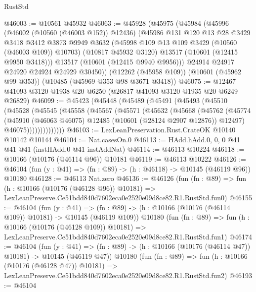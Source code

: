 \begin{lexlean}{RustStd}
\begin{coremodule}
@46003 := @10561 @45932
@46063 := @45928
    (@45975
      (@45984
        (@45996
          (@46002 (@10560 (@46003 @152)) @12436)
          (@45986
            @131
            @120
            @13
            @28
            @3429
            @3418
            @3412
            @3873
            @9949
            @3632
            (@45998 @109 @13 @109 @3429 (@10560 (@46003 @109)) @10703)
            (@10817 @45932 @3120)
            @13517
            (@10601 (@12415 @9950 @3418)))
          @13517
          (@10601 (@12415 @9940 @9956)))
        @24914
        @24917
        @24920
        @24924
        @24929
        @30450))
    (@12262 (@45958 @109))
    (@10601 (@45962 @99 @353))
    (@10485 (@45969 @353 @98 @3671 @3418))
@46075 := @12467 @41093 @3120 @1938 @20 @6250 (@26817 @41093 @3120 @1935 @20 @6249 @26829)
@46099 := @45423
    (@45448
      (@45489
        (@45491
          (@45493
            (@45510
              (@45528
                (@45545
                  (@45558
                    (@45567
                      (@45571
                        (@45632
                          (@45668
                            (@45762
                              (@45774
                                (@45910
                                  (@46063 @46075)
                                  @12485
                                  (@10601 (@28124 @2907 @12876))
                                  @12497)
                                @46075))))))))))))))
@46103 := LexLeanPreservation.Rust.CrateOK @10140 @10142 @10144
@46104 := Nat.casesOn.{0}
@46113 := HAdd.hAdd.{0, 0, 0} @41 @41 @41 (instHAdd.{0} @41 instAddNat)
@46114 := @46113 @10224
@46118 := @10166 (@10176 (@46114 @96)) @10181
@46119 := @46113 @10222
@46126 := @46104 (fun (y : @41) => (fn : @89) -> (h : @46118) -> @10145 (@46119 @96)) @10180
@46128 := @46113 Nat.zero
@46136 := @46126
    (fun (fn : @89) =>
    fun (h : @10166 (@10176 (@46128 @96)) @10181) =>
    LexLeanPreserve.Ce51bdd840d7602eca0e2520e09d8ce82.R1.RustStd.fun0)
@46155 := @46104
    (fun (y : @41) =>
    (fn : @89) -> (h : @10166 (@10176 (@46114 @109)) @10181) -> @10145 (@46119 @109))
    @10180
    (fun (fn : @89) =>
    fun (h : @10166 (@10176 (@46128 @109)) @10181) =>
    LexLeanPreserve.Ce51bdd840d7602eca0e2520e09d8ce82.R1.RustStd.fun1)
@46174 := @46104
    (fun (y : @41) =>
    (fn : @89) -> (h : @10166 (@10176 (@46114 @47)) @10181) -> @10145 (@46119 @47))
    @10180
    (fun (fn : @89) =>
    fun (h : @10166 (@10176 (@46128 @47)) @10181) =>
    LexLeanPreserve.Ce51bdd840d7602eca0e2520e09d8ce82.R1.RustStd.fun2)
@46193 := @46104

\end{coremodule}
\end{lexlean}
